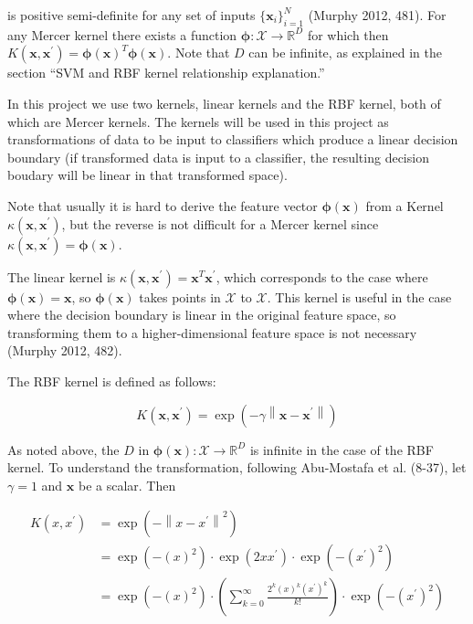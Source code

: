 \documentclass[letterpaper, 11pt]{article}
\newcommand{\norm}[1]{\left\lVert #1 \right\rVert}
\newcommand{\vect}[1]{\boldsymbol{#1}}
\begin{document}
is positive semi-definite for any set of inputs $\{\vect{x}_i\}_{i=1}^N$ (Murphy 2012, 481). For any Mercer kernel there exists a function $\vect{\phi}: \mathcal{X} \rightarrow \mathbb{R}^D$ for which then $K(\vect{x}, \vect{x}^\prime) = \vect{\phi}(\vect{x})^T\vect{\phi}(\vect{x})$. Note that $D$ can be infinite, as explained in the section ``SVM and RBF kernel relationship explanation.''

In this project we use two kernels, linear kernels and the RBF kernel, both of which are Mercer kernels. The kernels will be used in this project as transformations of data to be input to classifiers which produce a linear decision boundary (if transformed data is input to a classifier, the resulting decision boudary will be linear in that transformed space).

Note that usually it is hard to derive the feature vector $\vect{\phi}(\vect{x})$ from a Kernel $\kappa(\vect{x}, \vect{x}^\prime)$, but the reverse is not difficult for a Mercer kernel since $\kappa(\vect{x}, \vect{x}^\prime) = \vect{\phi}(\vect{x})$.

The linear kernel is $\kappa(\vect{x}, \vect{x}^\prime) = \vect{x}^T\vect{x}^\prime$, which corresponds to the case where $\vect{\phi}(\vect{x}) = \vect{x}$, so $\vect{\phi}(\vect{x})$ takes points in $\mathcal{X}$ to $\mathcal{X}$. This kernel is useful in the case where the decision boundary is linear in the original feature space, so transforming them to a higher-dimensional feature space is not necessary (Murphy 2012, 482).

The RBF kernel is defined as follows:

\begin{equation*}
  K(\vect{x}, \vect{x}^\prime) = \exp\left(-\gamma \norm{\vect{x} - \vect{x}^\prime}\right)
\end{equation*}

As noted above, the $D$ in $\vect{\phi}(\vect{x}): \mathcal{X} \rightarrow \mathbb{R}^D$ is infinite in the case of the RBF kernel. To understand the transformation, following Abu-Mostafa et al. (8-37), let $\gamma = 1$ and $\vect{x}$ be a scalar. Then

\begin{align*}
  K(x, x^\prime) & = \exp\left(-\norm{x - x^\prime}^2\right) \\
  & = \exp\left(-(x)^2\right) \cdot \exp\left(2xx^\prime\right) \cdot \exp(-\left(x^\prime\right)^2) \\
  & = \exp\left(-(x)^2\right) \cdot \left(\sum_{k=0}^{\infty} \frac{2^k(x)^k\left(x^\prime\right)^k}{k!}\right) \cdot \exp\left(-\left(x^\prime\right)^2\right)
\end{align*}
\end{document}
